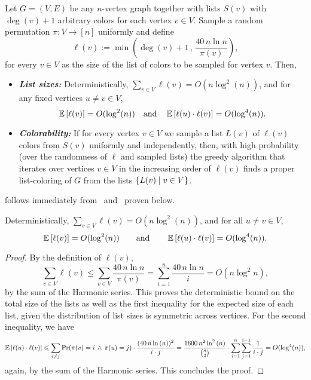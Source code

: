 \begin{theorem}\label{thm:apst-deg+1}
	Let $G=(V,E)$ be any $n$-vertex graph together with lists $S(v)$ with $\deg(v)+1$ arbitrary colors for each vertex $v\in V$.
	Sample a random permutation $\pi: V \rightarrow [n]$ uniformly and define 
	\[
	\ell(v) := \min \left( \deg(v)+1\, , \,  \frac{40\,n\ln{n}}{\pi(v)}\right),
	\]
	for every $v \in V$ as the size of the list of colors to be sampled for vertex $v$. Then,  
	\begin{itemize}
		\item \emph{\textbf{List sizes:}} Deterministically, $\sum_{v \in V} \ell(v) = O(n\log^2\!{(n)})$, and for any fixed vertices $u \neq v \in V$, 
		\[
		\operatorname*{{\mathbb{E}}}\left[\ell(v)\right] = O(\log^2\!{(n)}) \quad \text{and} \quad \operatorname*{{\mathbb{E}}}\left[\ell(u) \cdot \ell(v)\right] = O(\log^{4}\!{(n)}). 
		\] 
		\item \emph{\textbf{Colorability:}}
		If for every vertex $v \in V$ we sample a list $L(v)$ of $\ell(v)$ colors from $S(v)$ uniformly and independently, then, with high probability (over the randomness of $\ell$ and sampled lists) the greedy 
		algorithm that iterates over vertices $v \in V$ in the increasing order of $\ell(v)$ finds a proper list-coloring of $G$ from the lists 
		$\left\{ L(v) \mid v \in V \right\}$. 
	\end{itemize}
	
\end{theorem}
	 follows immediately from~ and~ proven below. 
	\begin{lemma}\label{clm:apst-list-sizes}
		Deterministically, $\sum_{v \in V} \ell(v) = O(n\log^2\!{(n)})$, and for all $u \neq v \in V$, 
		\[
		\operatorname*{{\mathbb{E}}}\left[\ell(v)\right] = O(\log^2\!{(n)}) \qquad \text{and} \qquad \operatorname*{{\mathbb{E}}}\left[\ell(u) \cdot \ell(v)\right] =O(\log^{4}\!{(n)}). 
		\]
	\end{lemma}
	\begin{proof}
		By the definition of $\ell(v)$, 
		\[
		\sum_{v \in V} \ell(v) \leq \sum_{v \in V} \frac{40\,n\ln{n}}{\pi(v)} = \sum_{i=1}^{n} \frac{40\,n\ln{n}}{i} = O(n\log^2{n}),
		\]
		by the sum of the Harmonic series. This proves the deterministic bound on the total size of the lists as well as the first inequality for the expected size of each list, 
		given the distribution of list sizes is symmetric across vertices. For the second inequality, we have
		\[
		\operatorname*{{\mathbb{E}}}\left[\ell(u) \cdot \ell(v)\right]  \leqslant \sum_{i \neq j} \operatorname*{\textnormal{Pr}}(\pi(v)=i \, \wedge \, \pi(u)=j) \cdot \frac{(40\,n\ln{(n)})^2}{i\cdot j} = \frac{1600\,n^2\ln^2{(n)}}{{{n}\choose{2}}} \cdot \sum_{i =1}^{n} \sum_{j=1}^{i-1} \frac{1}{i \cdot j} = O(\log^4(n)),
		\]
		again, by the sum of the Harmonic series. This concludes the proof. 
		
	\end{proof}
	
